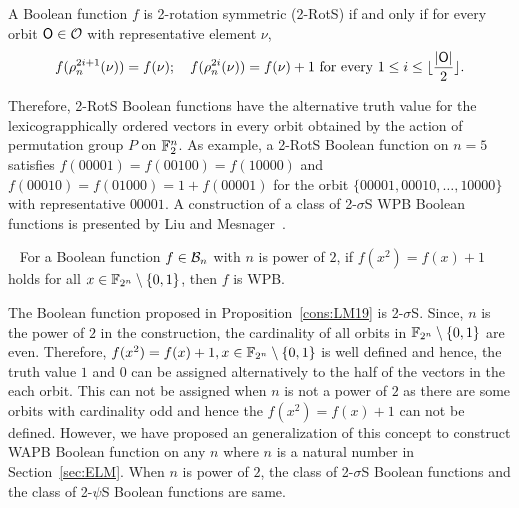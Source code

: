 \documentclass{llncs}
\begin{document}
\begin{definition}\label{def:2RSF}
A Boolean function $f$ is 2-rotation symmetric (2-RotS) if and only if 
for every orbit $\mathsf{O} \in \mathcal{O}$ with representative element $\nu$,
$$f(\rho_n^{2i+1}(\nu)) = f(\nu);~~~ f(\rho_n^{2i}(\nu)) = f(\nu)+1 \text{ for every } 1 \leq i \leq \lfloor\frac{|\mathsf{O}|}{2}\rfloor.$$ 
\end{definition}
Therefore, 2-RotS Boolean functions have the alternative truth value for the lexicograpphically ordered vectors in every orbit obtained by the action of permutation group $P$ on $\mathbb{F}_2^n$. 
As example, a 2-RotS Boolean function on $n = 5$ satisfies $f(00001) = f(00100) = f(10000)$ and $f(00010) = f(01000) = 1+f(00001)$ for the orbit $\{00001, 00010, \ldots, 10000\}$ with representative  $00001$.
\fi
A construction of a class of 2-$\sigma$S WPB Boolean functions is presented by Liu and Mesnager~\cite{DCC:LiuMes19}.
\begin{proposition}~\cite{DCC:LiuMes19}\label{cons:LM19} For a Boolean function $f \in \mathcal{B}_n$ with $n$ is power of $2$, if $f(x^2)=f(x)+1$ holds for all $x \in \mathbb{F}_{2^n} \setminus \{0,1\}$, then $f$ is WPB.  
\end{proposition}
The Boolean function proposed in Proposition~\ref{cons:LM19} is 2-$\sigma$S.
Since, $n$ is the power of $2$ in the construction, the cardinality of all orbits in $\mathbb{F}_{2^n} \setminus \{0,1\}$ are even. Therefore, $f(x^2)=f(x)+1, x \in \mathbb{F}_{2^n} \setminus \{0,1\}$ is well defined and hence, the truth value $1$ and $0$ can be assigned alternatively to the half of the vectors in the each orbit. This can not be assigned when $n$ is not a power of $2$ as there are some orbits with cardinality odd and hence the $f(x^2) = f(x)+1$ can not be defined. However, we have proposed an generalization of this concept to construct WAPB Boolean function on any $n$ where $n$ is a natural number in Section~\ref{sec:ELM}. When $n$ is power of $2$, the class of 2-$\sigma$S Boolean functions and the class of 2-$\psi$S Boolean functions are same.
\end{document}
